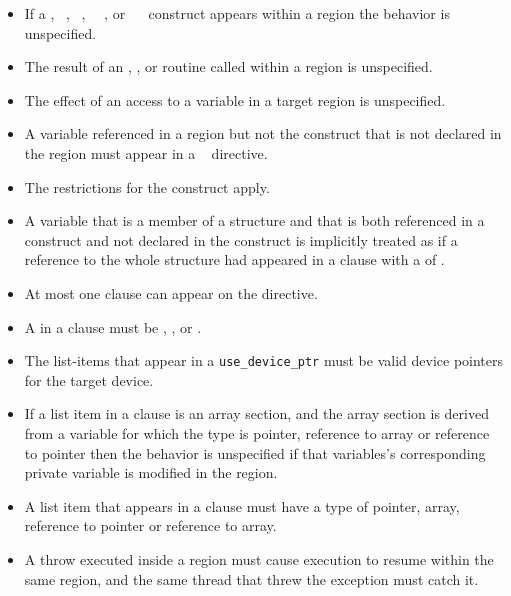 \restrictions
\begin{itemize}
\item If a , ~, 
~, ~~, or 
~~ construct appears within a 
 region the behavior is unspecified.

\item The result of an , 
, or  
routine called within a  region is unspecified.

\item The effect of an access to a  variable in a target region is 
unspecified.

\item A variable referenced in a  region but not the  construct that is not 
declared in the  region must appear in a ~ directive. 

\item The restrictions for the  construct apply.

\item A variable that is a member of a structure and that is both referenced in a  construct and not declared in the construct 
is implicitly treated as if a reference to the whole structure had appeared in a  clause with a  of 
. 

\item At most one  clause can appear on the directive.

\item A  in a  clause must be , ,  or .
  \item The list-items that appear in a \verb#use_device_ptr# must be valid
    device pointers for the target device.

\ccppspecificstart
\item If a list item in a  clause is an array section, and the array section is derived from a variable for which the type is pointer, reference to array or reference to pointer then the behavior is unspecified if that variables's corresponding private variable is modified in the region.
\ccppspecificend

\cppspecificstart
\item A list item that appears in a  clause must have a type
  of pointer, array, reference to pointer or reference to array.
\item A throw executed inside a  region must cause execution to resume within the
same  region, and the same thread that threw the exception must catch it. 
\cppspecificend


\end{itemize}
